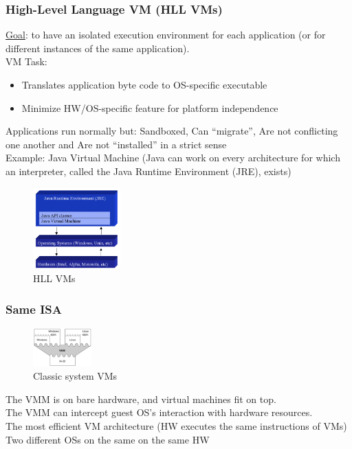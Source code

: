 \documentclass[10pt, oneside]{article}
\begin{document}
\subsubsection*{High-Level Language VM (HLL VMs)}
\begin{multicols}{2}
    \underline{Goal}: to have an isolated execution environment for each application (or for different instances of the same application).\\
    VM Task:
    \begin{itemize}
        \item Translates application byte code to OS-specific executable
        \item Minimize HW/OS-specific feature for platform independence
    \end{itemize}Applications run normally but: Sandboxed, Can “migrate”, Are not conflicting one another and Are not “installed” in a strict sense\\
Example: Java Virtual Machine (Java can work on every architecture for which an interpreter, called the Java Runtime Environment (JRE), exists)
    \columnbreak
    \noindent
    \begin{figure}[H]
        \begin{center}
        \includegraphics[width=0.3\textwidth]{img/img35.png}
        \caption{HLL VMs}
        \label{fig:HLL VMs}
        \end{center}
    \end{figure}
\end{multicols}
\subsubsection*{Same ISA}
\begin{multicols}{2}
    \begin{figure}[H]
        \begin{center}
        \includegraphics[width=0.2\textwidth]{img/img36.png}
        \caption{Classic system VMs}
        \label{fig:same ISA}
        \end{center}
    \end{figure}
    \columnbreak
    The VMM is on bare hardware, and virtual machines fit on top.\\
The VMM can intercept guest OS’s interaction with hardware resources.\\
The most efficient VM architecture (HW executes the same instructions of VMs)\\
Two different OSs on the same on the same HW
\end{multicols}
\end{document}
